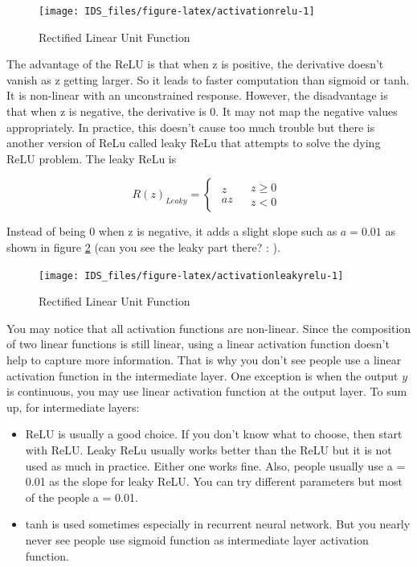 \documentclass[12pt,]{krantz}
\providecommand{\tightlist}{%
  \setlength{\itemsep}{0pt}\setlength{\parskip}{0pt}}
\begin{document}
\begin{figure}

{\centering \texttt{[image: IDS\_files/figure-latex/activationrelu-1]} 

}

\caption{Rectified Linear Unit Function}\label{fig:activationrelu}
\end{figure}

The advantage of the ReLU is that when z is positive, the derivative doesn't vanish as z getting larger. So it leads to faster computation than sigmoid or tanh. It is non-linear with an unconstrained response. However, the disadvantage is that when z is negative, the derivative is 0. It may not map the negative values appropriately. In practice, this doesn't cause too much trouble but there is another version of ReLu called leaky ReLu that attempts to solve the dying ReLU problem. The leaky ReLu is

\[R(z)_{Leaky}=\begin{cases}
\begin{array}{c}
z\\
az
\end{array} & \begin{array}{c}
z\geq0\\
z<0
\end{array}\end{cases}\]

Instead of being 0 when z is negative, it adds a slight slope such as \(a=0.01\) as shown in figure \ref{fig:activationleakyrelu} (can you see the leaky part there? : ).

\begin{figure}

{\centering \texttt{[image: IDS\_files/figure-latex/activationleakyrelu-1]} 

}

\caption{Rectified Linear Unit Function}\label{fig:activationleakyrelu}
\end{figure}

You may notice that all activation functions are non-linear. Since the composition of two linear functions is still linear, using a linear activation function doesn't help to capture more information. That is why you don't see people use a linear activation function in the intermediate layer. One exception is when the output \(y\) is continuous, you may use linear activation function at the output layer. To sum up, for intermediate layers:

\begin{itemize}
\tightlist
\item
  ReLU is usually a good choice. If you don't know what to choose, then start with ReLU. Leaky ReLu usually works better than the ReLU but it is not used as much in practice. Either one works fine. Also, people usually use a = 0.01 as the slope for leaky ReLU. You can try different parameters but most of the people a = 0.01.
\item
  tanh is used sometimes especially in recurrent neural network. But you nearly never see people use sigmoid function as intermediate layer activation function.
\end{itemize}
\end{document}
